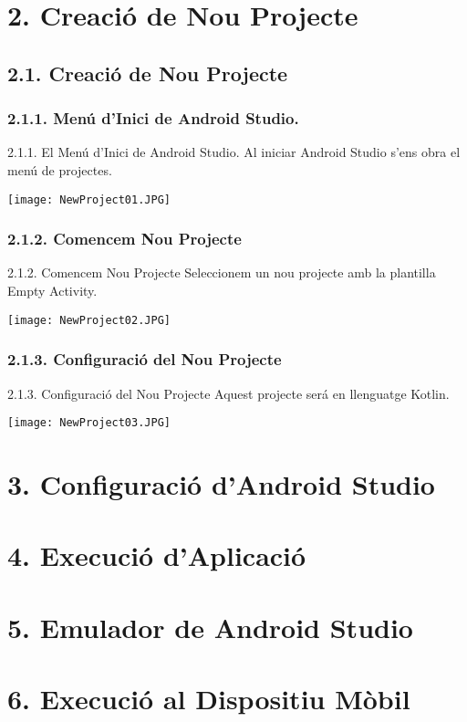 \documentclass[12pt]{beamer}
\begin{document}
	\section{2. Creació de Nou Projecte}
	\subsection{2.1. Creació de Nou Projecte}
	\subsubsection{2.1.1. Menú d'Inici de Android Studio.}
	\begin{frame}
		\begin{block}{2.1.1. El Menú d'Inici de Android Studio.}
			Al iniciar Android Studio s'ens obra el menú de projectes.
		\end{block}
		\centering\texttt{[image: NewProject01.JPG]}\\
	\end{frame}
	\subsubsection{2.1.2. Comencem Nou Projecte}
	\begin{frame}
		\begin{block}{2.1.2. Comencem Nou Projecte}
			Seleccionem un nou projecte amb la plantilla Empty Activity.
		\end{block}
		\centering\texttt{[image: NewProject02.JPG]}\\
	\end{frame}
	\subsubsection{2.1.3. Configuració del Nou Projecte}
	\begin{frame}
		\begin{block}{2.1.3. Configuració del Nou Projecte}
			Aquest projecte será en llenguatge Kotlin.
		\end{block}
		\centering\texttt{[image: NewProject03.JPG]}
	\end{frame}
	\section{3. Configuració d'Android Studio}
	\section{4. Execució d'Aplicació}
	\section{5. Emulador de Android Studio}
	\section{6. Execució al Dispositiu Mòbil}
\end{document}
